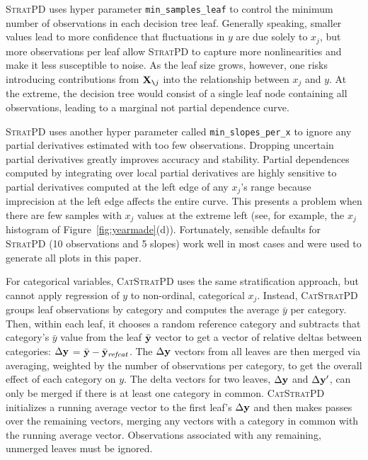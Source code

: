 \documentclass{article}
\newcommand{\figref}[1]{Figure~\ref{#1}}
\newcommand{\spd}{\fontfamily{cmr}\textsc{\small StratPD}}
\newcommand{\cspd}{\fontfamily{cmr}\textsc{\small CatStratPD}}
\newcommand{\xnj}{${\bf X}_{\texttt{\char`\\}j}$}
\begin{document}
\spd{} uses hyper parameter {\tt\small min\_samples\_leaf} to control the minimum number of observations in each decision tree leaf.  Generally speaking, smaller values lead to more confidence that fluctuations in $y$ are due solely to $x_j$, but more observations per leaf allow \spd{} to capture more nonlinearities and make it less susceptible to noise.  As the leaf size grows, however, one risks introducing contributions from \xnj{} into the relationship between $x_j$ and $y$. At the extreme, the decision tree would consist of a single leaf node containing all observations, leading to a marginal not partial dependence curve.

\spd{} uses another hyper parameter called {\tt\small min\_slopes\_per\_x} to ignore any partial derivatives estimated with too few observations.  Dropping uncertain partial derivatives greatly improves accuracy and stability. Partial dependences computed by integrating over local partial derivatives are highly sensitive to partial derivatives computed at the left edge of any $x_j$'s range because imprecision at the left edge affects the entire curve.  This presents a problem when there are few samples with $x_j$ values at the extreme left (see, for example, the $x_j$ histogram of \figref{fig:yearmade}(d)).  Fortunately, sensible defaults for \spd{} (10 observations and 5 slopes) work well in most cases and  were used to generate all plots in this paper.

For categorical variables, \cspd{} uses the same stratification approach, but cannot apply  regression of $y$ to non-ordinal, categorical $x_j$. Instead, \cspd{} groups leaf observations by category and computes the average $\bar{y}$ per category. Then,  within each leaf, it chooses a random reference category and subtracts that category's $\bar{y}$ value from the leaf $\bar{\bf y}$ vector to get a vector of relative deltas between categories: $\Delta {\bf y}$ = $\bar{\bf y} - \bar{\bf y}_{\it refcat}$. The $\Delta  {\bf y}$ vectors from all leaves are then merged via averaging, weighted by the number of observations per category, to get the overall effect of each category on $y$.  The delta vectors for two leaves, $\Delta {\bf y}$ and $\Delta {\bf y}'$, can only be merged if there is at least one category in common.  \cspd{} initializes a running average vector to the first leaf's $\Delta  {\bf y}$ and then makes  passes over the remaining vectors, merging any vectors with a category in common with the running average vector.  Observations associated with any remaining, unmerged leaves must be ignored.
\end{document}
